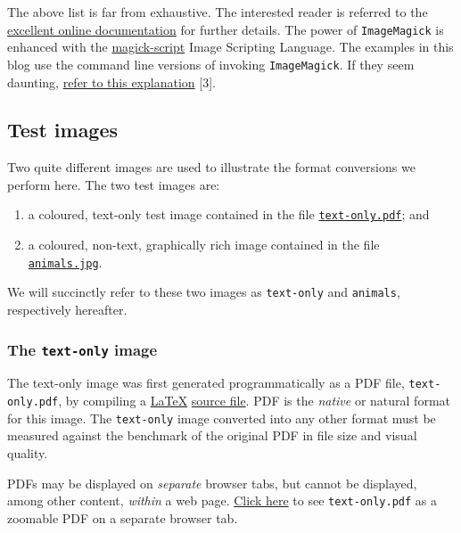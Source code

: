 \documentclass[
  11pt,
  british,
  a4paper,
]{article}
\providecommand{\tightlist}{%
  \setlength{\itemsep}{0pt}\setlength{\parskip}{0pt}}
\begin{document}
The above list is far from exhaustive. The interested reader is referred
to the
\href{https://imagemagick.org/script/command-line-tools.php}{excellent
online documentation} for further details. The power of
\texttt{ImageMagick} is enhanced with the
\href{https://imagemagick.org/script/magick-script.php}{magick-script}
Image Scripting Language. The examples in this blog use the command line
versions of invoking \texttt{ImageMagick}. If they seem daunting,
\href{https://imagemagick.org/script/command-line-processing.php}{refer
to this explanation} {[}3{]}.

\hypertarget{test-images}{%
\subsection{Test images}\label{test-images}}

Two quite different images are used to illustrate the format conversions
we perform here. The two test images are:

\begin{enumerate}
\tightlist
\item
  a coloured, text-only test image contained in the file
  \href{images/text-only.pdf}{\texttt{text-only.pdf}}; and
\item
  a coloured, non-text, graphically rich image contained in the file
  \href{images/animals.jpg}{\texttt{animals.jpg}}.
\end{enumerate}

We will succinctly refer to these two images as \texttt{text-only} and
\texttt{animals}, respectively hereafter.

\hypertarget{the-text-only-image}{%
\subsubsection{\texorpdfstring{The \texttt{text-only}
image}{The text-only image}}\label{the-text-only-image}}

The text-only image was first generated programmatically as a PDF file,
\texttt{text-only.pdf}, by compiling a
\href{https://www.latex-project.org/}{LaTeX}
\href{auxiliary/text-only.tex}{source file}. PDF is the \emph{native} or
natural format for this image. The \texttt{text-only} image converted
into any other format must be measured against the benchmark of the
original PDF in file size and visual quality.

PDFs may be displayed on \emph{separate} browser tabs, but cannot be
displayed, among other content, \emph{within} a web page.
\href{images/text-only.pdf}{Click here} to see \texttt{text-only.pdf} as
a zoomable PDF on a separate browser tab.
\end{document}

